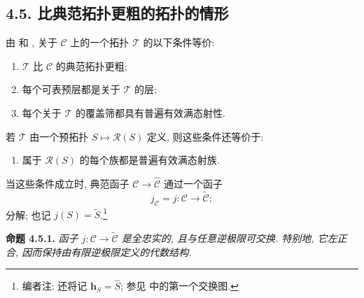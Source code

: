 
\setcounter{footnote}{39}

\subsection*{4.5. 比典范拓扑更粗的拓扑的情形}

由  和
,
关于 \(\mathscr C\) 上的一个拓扑 \(\mathcal T\) 的以下条件等价:
\begin{enumerate}
  \item[(i)]
  \(\mathcal T\) 比 \(\mathscr C\) 的典范拓扑更粗;
  \item[(ii)]
  每个可表预层都是关于 \(\mathcal T\) 的层;
  \item[(iii)]
  每个关于 \(\mathcal T\) 的覆盖筛都具有普遍有效满态射性.
\end{enumerate}
若 \(\mathcal T\) 由一个预拓扑 \(S\mapsto\mathscr R(S)\) 定义,
则这些条件还等价于:
\begin{enumerate}
  \item[(iv)]
  属于 \(\mathscr R(S)\) 的每个族都是普遍有效满态射族.
\end{enumerate}

当这些条件成立时, 典范函子
\(\mathscr C\to\widehat{\mathscr C}\) 通过一个函子
\[
  j_{\mathscr C}=j:\mathscr C\longrightarrow\widetilde{\mathscr C};
\]
分解; 也记 \(j(S)=\widetilde S\).\footnote{编者注: 还将记
\(\mathbf h_S=\widehat S\); 参见 
中的第一个交换图.}

\medskip
\noindent{}\textbf{命题 4.5.1.}
\textit{函子 \(j:\mathscr C\to\widetilde{\mathscr C}\) 是全忠实的,
且与任意逆极限可交换. 特别地, 它左正合,
因而保持由有限逆极限定义的代数结构.}

